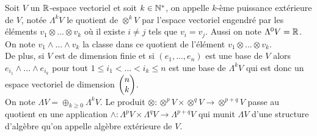 \documentclass[12pt, a4paper]{book}
\begin{document}
\begin{defi}
Soit $V$ un $\R$-espace vectoriel et soit $k\in \N^*$, on appelle $k$-ème puissance extérieure de $V$, notée $\Lambda^k V$ le quotient de $\otimes^k V$ par l'espace vectoriel engendré par les éléments $v_1 \otimes ... \otimes v_k$ où il existe $i\neq j$ tels que $v_i = v_j$. Aussi on note $\Lambda^0 V = \R$.\\
On note $v_1 \wedge ... \wedge v_k$ la classe dans ce quotient de l'élément $v_1 \otimes ... \otimes v_k$. \\

De plus, si $V$ est de dimension finie et si $(e_1, ..., e_n)$ est une base de $V$ alors $e_{i_1} \wedge ... \wedge e_{i_k}$ pour tout $1 \leq i_1 < ... < i_k \leq n$ est une base de $\Lambda^k V$ qui est donc un espace vectoriel de dimension $\bino{k}{n}$. \\
On note $\Lambda V = \oplus_{k\geq 0} \Lambda^k V$. Le produit $\otimes : \otimes^p V\times \otimes^q V \to \otimes^{p+q} V$ passe au quotient en une application $\wedge : \Lambda^p V \times \Lambda^q V \to \Lambda^{p+q} V$ qui munit $\Lambda V$ d'une structure d'algèbre qu'on appelle algèbre extérieure de $V$.
\end{defi}
\end{document}
